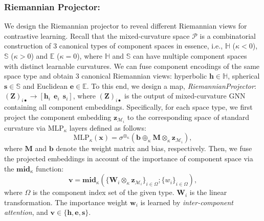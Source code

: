 \subsubsection{Riemannian Projector:}
We design the Riemannian projector to reveal different Riemannian views for contrastive learning.
Recall that the mixed-curvature space $\mathcal P$ is a combinatorial construction of $3$ canonical types of component spaces in essence, i.e., $\mathbb H$ ($\kappa<0$), $\mathbb S$ ($\kappa>0$) and $\mathbb E$ ($\kappa=0$), where $\mathbb H$ and $\mathbb S$ can have multiple component spaces with distinct learnable curvatures.
We can fuse component encodings of the same space type and obtain $3$ canonical Riemannian views: hyperbolic  $\mathbf h \in \mathbb H$, spherical $\mathbf s \in \mathbb S$  and Euclidean $\mathbf e \in \mathbb E$.
To this end, we design a map, \emph{RiemannianProjector}: $(\mathbf Z)_{i \bullet} \to [\mathbf h_i \ \ \mathbf e_i \ \ \mathbf s_i] $, 
where $(\mathbf Z)_{i \bullet}$ is the output of mixed-curvature GNN containing all component embeddings.
Specifically, for each space type, we first project the component embedding $\boldsymbol z_{\mathcal M_i}$ to the corresponding space of standard curvature via $\text{MLP}_\kappa$ layers defined as follows:
\begin{equation}
\text{MLP}_\kappa( \mathbf x)=\sigma^{\otimes_\kappa}( \mathbf b \oplus_\kappa \mathbf M \otimes_\kappa \boldsymbol z_{\mathcal M_i} ),
 \end{equation}
where $\mathbf M$ and  $\mathbf b$ denote the weight matrix and bias, respectively.
Then, we fuse the projected embeddings in account of the importance of component space via the $\mathbf{mid}_{\kappa}$ function:
\begin{equation}
\mathbf v= \mathbf{mid}_{\kappa}\left( \{ \mathbf W_i \otimes_\kappa \boldsymbol z_{\mathcal M_i}\}_{i \in \Omega}; \{{w}_i\}_{i \in \Omega} \right),
 \end{equation}
where $\Omega$ is the component index set of the given type. $\mathbf{W}_i$ is the linear transformation. The importance weight $\boldsymbol{w}_i$ is learned by \emph{inter-component attention}, and  $\mathbf v \in \{\mathbf h, \mathbf e, \mathbf s\}$.


